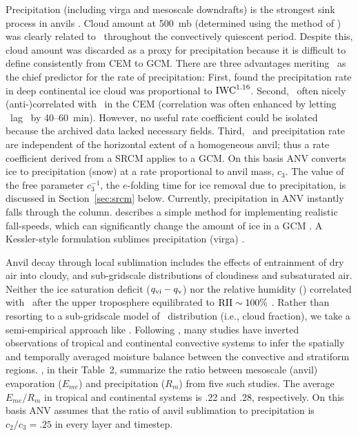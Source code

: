 \documentclass[twoside,agums]{aguplus}
\begin{document}
Precipitation (including virga and mesoscale downdrafts) is the 
strongest sink process in anvils \cite[]{LeH80,GaJ91}. 
Cloud amount at 500~mb (determined using the method of \cite{SLT94})
was clearly related to \IWPdot\ throughout the convectively quiescent
period.
Despite this, cloud amount was discarded as a proxy for precipitation 
because it is difficult to define consistently from CEM to GCM. 
There are three advantages meriting \IWC\ as the chief predictor for
the rate of precipitation: 
First, \cite{Hey77} found the precipitation rate in deep continental
ice cloud was proportional to $\mbox{\textrm{IWC}}^{1.16}$.
Second, \IWC\ often nicely (anti-)correlated with \IWCdot\ in the CEM
(correlation was often enhanced by letting \IWCdot\ lag \IWC\ by
40--60~min).
However, no useful rate coefficient could be isolated because the
archived data lacked necessary fields.
Third, \IWC\ and precipitation rate are independent of the horizontal 
extent of a homogeneous anvil; thus a rate coefficient derived from a
SRCM applies to a GCM. 
On this basis ANV converts ice to precipitation (snow) at a rate
proportional to anvil mass, $c_3$\qi.  
The value of the free parameter $c_3^{-1}$, the $e$-folding time for
ice removal due to precipitation, is discussed in
Section~\ref{sec:srcm} below.   
Currently, precipitation in ANV instantly falls through the column.
\cite{Smi90} describes a simple method for implementing realistic 
fall-speeds, which can significantly change the amount of ice in a GCM
\cite[]{SeM93}. 
A Kessler-style formulation sublimes precipitation (virga)
\cite[e.g.,][]{Sun88}.

Anvil decay through local sublimation includes the effects of
entrainment of dry air into cloudy, and sub-gridscale distributions
of cloudiness and subsaturated air.
Neither the ice saturation deficit ($\mbox{$q_\mathrm{vi}$} - \mbox{$q_\mathrm{v}$}$) nor the relative
humidity (\RH) correlated with \IWCdot\ after the upper troposphere
equilibrated to $\mbox{\textrm{RH}} \sim 100\%$ \cite[]{GMK95}.
Rather than resorting to a sub-gridscale model of \qvi\ distribution
(i.e., cloud fraction), we take a semi-empirical approach like
\cite{Don93}. 
Following \cite{LeH80}, many studies have inverted observations
of tropical and continental convective systems to infer the spatially
and temporally averaged moisture balance between the convective and
stratiform regions.
\cite{GaJ91}, in their Table~2, summarize the ratio between mesoscale
(anvil) evaporation ($E_{me}$) and precipitation ($R_m$) from five
such studies. 
The average $E_{me}/R_m$ in tropical and continental systems is .22
and .28, respectively.
On this basis ANV assumes that the ratio of anvil sublimation to
precipitation is  $c_2/c_3 = .25$ in every layer and timestep.
\end{document}
